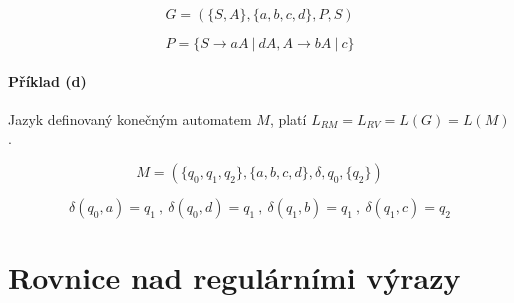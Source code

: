 $$ G = ( \{ S, A \}, \{ a, b, c, d \}, P, S ) $$

$$ P = \{ S \rightarrow aA ~|~ dA, A \rightarrow  bA ~|~ c \} $$

\paragraph*{Příklad (d)} Jazyk definovaný konečným automatem $M$, platí $L_{RM} = L_{RV} = L(G) = L(M)$.

$$ M = ( \{ q_0, q_1, q_2 \}, \{ a, b, c, d \}, \delta, q_0, \{ q_2 \} ) $$

$$ \delta(q_0, a) = q_1 ~,~ \delta(q_0, d) = q_1 ~,~ \delta(q_1, b) = q_1 ~,~ \delta(q_1, c) = q_2 $$


\section{Rovnice nad regulárními výrazy}

